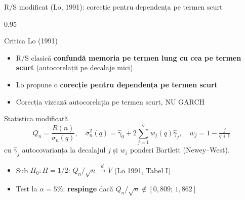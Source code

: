 \documentclass[9pt, aspectratio=169, t]{beamer}
\begin{document}
\begin{frame}[shrink=15]{R/S modificat (Lo, 1991): corecție pentru dependența pe termen scurt}
\begin{cminipage}{0.95\textwidth}
\begin{alertblock}{Critica Lo (1991)}
\begin{itemize}\setlength{\itemsep}{0pt}
    \item R/S clasică \textbf{confundă memoria pe termen lung cu cea pe termen scurt} (autocorelații pe decalaje mici)
    \item Lo propune o \textbf{corecție pentru dependența pe termen scurt}
    \item Corecția vizează autocorelația pe termen scurt, NU GARCH
\end{itemize}
\end{alertblock}
\begin{block}{Statistica modificată}
\[
    Q_n=\frac{R(n)}{\sigma_n(q)},\quad
    \sigma_n^2(q)=\hat\gamma_0+2\sum_{j=1}^{q}w_j(q)\hat\gamma_j,\quad w_j=1-\tfrac{j}{q+1}
\]
cu $\hat\gamma_j$ autocovarianța la decalajul $j$ și $w_j$ ponderi Bartlett (Newey--West).
\end{block}
\begin{itemize}\setlength{\itemsep}{0pt}
    \item Sub $H_0:H=1/2$: $Q_n/\sqrt n \xrightarrow{d} V$ (Lo 1991, Tabel I)
    \item Test la $\alpha=5\%$: \textbf{respinge} dacă $Q_n/\sqrt n\notin[0{,}809;\,1{,}862]$
\end{itemize}
\end{cminipage}
\end{frame}
\end{document}
